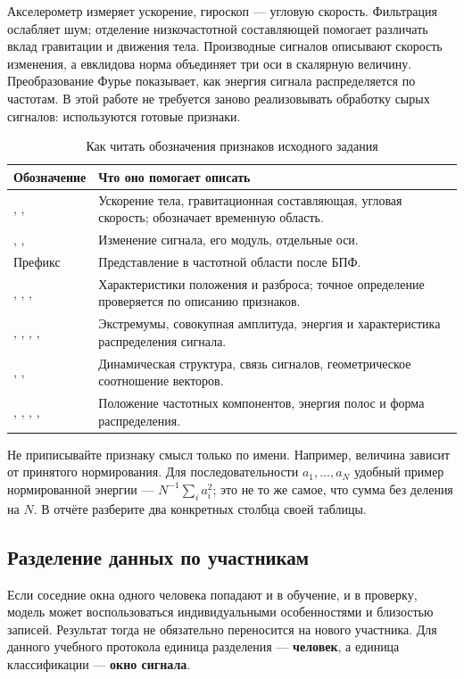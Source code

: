 Акселерометр измеряет ускорение, гироскоп --- угловую скорость. Фильтрация ослабляет шум; отделение низкочастотной составляющей помогает различать вклад гравитации и движения тела. Производные сигналов описывают скорость изменения, а евклидова норма объединяет три оси в скалярную величину. Преобразование Фурье показывает, как энергия сигнала распределяется по частотам. В этой работе не требуется заново реализовывать обработку сырых сигналов: используются готовые признаки.

\begin{table}[H]\centering\small
\caption{Как читать обозначения признаков исходного задания}
\begin{tabularx}{\textwidth}{@{}>{\raggedright\arraybackslash}p{}Y@{}}
\toprule
Обозначение & Что оно помогает описать \\
\midrule
{}, ,  & Ускорение тела, гравитационная составляющая, угловая скорость;  обозначает временную область. \\
, ,  & Изменение сигнала, его модуль, отдельные оси. \\
Префикс  & Представление в частотной области после БПФ. \\
, , ,  & Характеристики положения и разброса; точное определение проверяется по описанию признаков. \\
, , , ,  & Экстремумы, совокупная амплитуда, энергия и характеристика распределения сигнала. \\
, ,  & Динамическая структура, связь сигналов, геометрическое соотношение векторов. \\
, , , ,  & Положение частотных компонентов, энергия полос и форма распределения. \\
\bottomrule
\end{tabularx}\end{table}

Не приписывайте признаку смысл только по имени. Например, величина  зависит от принятого нормирования. Для последовательности \(a_1,\ldots,a_N\) удобный пример нормированной энергии --- \(N^{-1}\sum_i a_i^2\); это не то же самое, что сумма без деления на \(N\). В отчёте разберите два конкретных столбца своей таблицы.

\subsection{Разделение данных по участникам}
Если соседние окна одного человека попадают и в обучение, и в проверку, модель может воспользоваться индивидуальными особенностями и близостью записей. Результат тогда не обязательно переносится на нового участника. Для данного учебного протокола единица разделения --- \textbf{человек}, а единица классификации --- \textbf{окно сигнала}.

